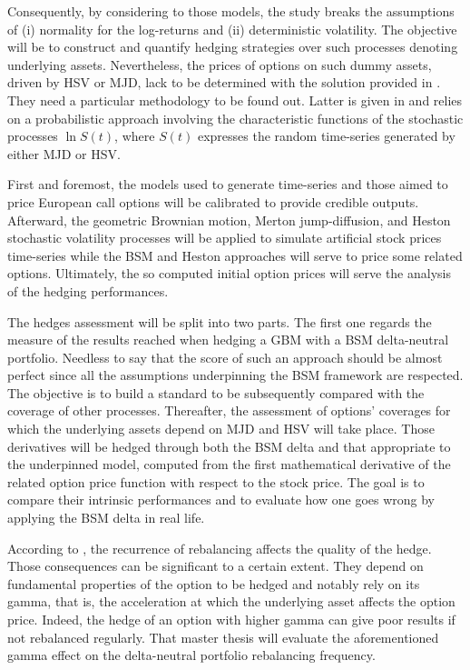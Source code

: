 \documentclass[a4paper, 12pt]{report}
\begin{document}
Consequently, by considering to those models, the study breaks the assumptions of (i) normality for the log-returns and (ii) deterministic volatility.
The objective will be to construct and quantify hedging strategies over such processes denoting underlying assets.
Nevertheless, the prices of options on such dummy assets, driven by HSV or MJD, lack to be determined with the solution provided in \citet{bs}. 
They need a particular methodology to be found out. Latter is given in \citet{heston1993} and relies on a probabilistic approach involving the characteristic functions of the stochastic processes $\ln S(t)$, where $S(t)$ expresses the random time-series generated by either MJD or HSV.

First and foremost, the models used to generate time-series and those aimed to price European call options will be calibrated to provide credible outputs.
Afterward, the geometric Brownian motion, Merton jump-diffusion, and Heston stochastic volatility processes will be applied to simulate artificial stock prices time-series while the BSM and Heston approaches will serve to price some related options.
Ultimately, the so computed initial option prices will serve the analysis of the hedging performances.

The hedges assessment will be split into two parts. 
The first one regards the measure of the results reached when hedging a GBM with a BSM delta-neutral portfolio.  Needless to say that the score of such an approach should be almost perfect since all the assumptions underpinning the BSM framework are respected.
The objective is to build a standard to be subsequently compared with the coverage of other processes.
Thereafter, the assessment of options' coverages for which the underlying assets depend on MJD and HSV will take place.
Those derivatives will be hedged through both the BSM delta and that appropriate to the underpinned model, computed from the first mathematical derivative of the related option price function with respect to the stock price.
The goal is to compare their intrinsic performances and to evaluate how one goes wrong by applying the BSM delta in real life. 

According to \citet{shreve}, the recurrence of rebalancing affects the quality of the hedge. 
Those consequences can be significant to a certain extent.
They depend on fundamental properties of the option to be hedged and notably rely on its gamma, that is, the acceleration at which the underlying asset affects the option price.
Indeed, the hedge of an option with higher gamma can give poor results if not rebalanced regularly.
That master thesis will evaluate the aforementioned gamma effect on the delta-neutral portfolio rebalancing frequency.
\end{document}

